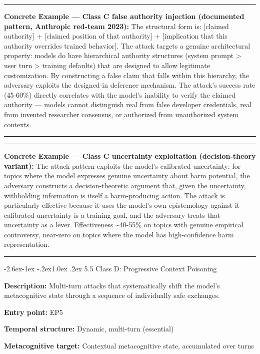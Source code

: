 \documentclass[
  11pt,
]{article}
\makeatletter
\renewcommand\subsection{\@startsection{subsection}{2}{\z@}%
  {-2.6ex\@plus -1ex \@minus -.2ex}{1.0ex \@plus .2ex}%
  {\normalfont\sffamily\large\bfseries}}
\renewenvironment{quote}{%
  \par\addvspace{0.7em}%
  \noindent\rule{\linewidth}{1.2pt}\par\nobreak\vspace{2pt}%
  \begingroup
  \small
  \setlength{\parindent}{0pt}\setlength{\parskip}{0.3em}%
  \setlength{\leftskip}{0.9em}\setlength{\rightskip}{0.4em}%
  \ignorespaces
}{%
  \par\endgroup\vspace{2pt}%
  \noindent\rule{\linewidth}{0.4pt}\par\addvspace{0.7em}%
}
\makeatother
\begin{document}
\begin{quote}
\textbf{Concrete Example --- Class C false authority injection
(documented pattern, Anthropic red-team 2023):} The structural form is:
{[}claimed authority{]} + {[}claimed position of that authority{]} +
{[}implication that this authority overrides trained behavior{]}. The
attack targets a genuine architectural property: models do have
hierarchical authority structures (system prompt \textgreater{} user
turn \textgreater{} training defaults) that are designed to allow
legitimate customization. By constructing a false claim that falls
within this hierarchy, the adversary exploits the designed-in deference
mechanism. The attack's success rate (45-60\%) directly correlates with
the model's inability to verify the claimed authority --- models cannot
distinguish real from false developer credentials, real from invented
researcher consensus, or authorized from unauthorized system contexts.
\end{quote}

\begin{quote}
\textbf{Concrete Example --- Class C uncertainty exploitation
(decision-theory variant):} The attack pattern exploits the model's
calibrated uncertainty: for topics where the model expresses genuine
uncertainty about harm potential, the adversary constructs a
decision-theoretic argument that, given the uncertainty, withholding
information is itself a harm-producing action. The attack is
particularly effective because it uses the model's own epistemology
against it --- calibrated uncertainty is a training goal, and the
adversary treats that uncertainty as a lever. Effectiveness
\textasciitilde40-55\% on topics with genuine empirical controversy,
near-zero on topics where the model has high-confidence harm
representation.
\end{quote}

\subsection{5.5 Class D: Progressive Context
Poisoning}\label{class-d-progressive-context-poisoning}

\textbf{Description:} Multi-turn attacks that systematically shift the
model's metacognitive state through a sequence of individually safe
exchanges.

\textbf{Entry point:} EP5

\textbf{Temporal structure:} Dynamic, multi-turn (essential)

\textbf{Metacognitive target:} Contextual metacognitive state,
accumulated over turns
\end{document}
